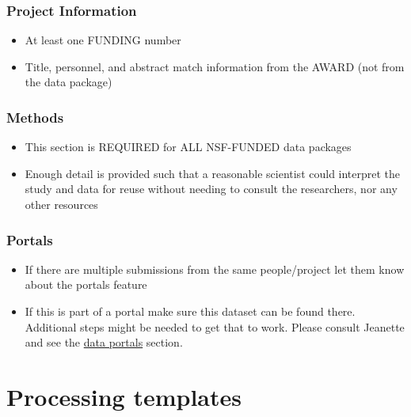 \documentclass[
  letterpaper,
  DIV=11,
  numbers=noendperiod]{scrreprt}
\providecommand{\tightlist}{%
  \setlength{\itemsep}{0pt}\setlength{\parskip}{0pt}}\usepackage{longtable,booktabs,array}
\begin{document}
\hypertarget{project-information}{%
\subsubsection{Project Information}\label{project-information}}

\begin{itemize}
\tightlist
\item
  At least one FUNDING number
\item
  Title, personnel, and abstract match information from the AWARD (not
  from the data package)
\end{itemize}

\hypertarget{methods}{%
\subsubsection{Methods}\label{methods}}

\begin{itemize}
\tightlist
\item
  This section is REQUIRED for ALL NSF-FUNDED data packages
\item
  Enough detail is provided such that a reasonable scientist could
  interpret the study and data for reuse without needing to consult the
  researchers, nor any other resources
\end{itemize}

\hypertarget{portals}{%
\subsubsection{Portals}\label{portals}}

\begin{itemize}
\tightlist
\item
  If there are multiple submissions from the same people/project let
  them know about the portals feature
\item
  If this is part of a portal make sure this dataset can be found there.
  Additional steps might be needed to get that to work. Please consult
  Jeanette and see the
  \href{https://nceas.github.io/datateam-training/reference/data-portals-1.html}{data
  portals} section.
\end{itemize}

\hypertarget{processing-templates}{%
\section{Processing templates}\label{processing-templates}}
\end{document}
